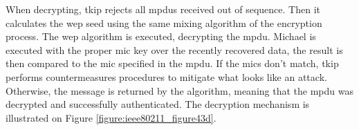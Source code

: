 When decrypting, \gls{tkip} rejects all \glspl{mpdu} received out of sequence. Then it calculates the \gls{wep} seed using the same mixing algorithm of the encryption process. The \gls{wep} algorithm is executed, decrypting the \gls{mpdu}. Michael is executed with the proper \gls{mic} key over the recently recovered data, the result is then compared to the \gls{mic} specified in the \gls{mpdu}. If the \glspl{mic} don't match, \gls{tkip} performs countermeasures procedures to mitigate what looks like an attack. Otherwise, the message is returned by the algorithm, meaning that the \gls{mpdu} was decrypted and successfully authenticated. The decryption mechanism is illustrated on Figure \ref{figure:ieee80211_figure43d}.

\FloatBarrier
